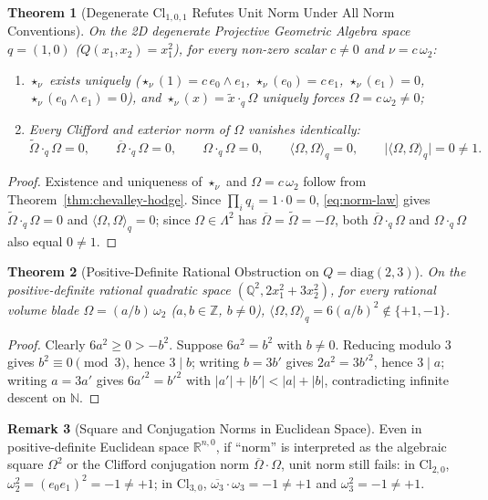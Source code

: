 \documentclass[11pt]{article}
\newtheorem{theorem}{Theorem}[section]
\theoremstyle{definition}
\newtheorem{remark}[theorem]{Remark}
\newcommand{\Cl}{\mathrm{Cl}}
\begin{document}
\begin{theorem}[Degenerate $\Cl_{1,0,1}$ Refutes Unit Norm Under All Norm Conventions]\label{thm:degenerate}
On the 2D degenerate Projective Geometric Algebra space $q = (1, 0)$ ($Q(x_1,x_2) = x_1^2$), for every non-zero scalar $c \neq 0$ and $\nu = c\,\omega_2$:
\begin{enumerate}
  \item[(1)] $\star_\nu$ exists uniquely ($\star_\nu(1) = c\,e_0\wedge e_1$, $\star_\nu(e_0) = c\,e_1$, $\star_\nu(e_1) = 0$, $\star_\nu(e_0\wedge e_1) = 0$), and $\star_\nu(x) = \widetilde{x}\cdot_q\Omega$ uniquely forces $\Omega = c\,\omega_2 \neq 0$;
  \item[(2)] Every Clifford and exterior norm of $\Omega$ vanishes identically:
  \[
    \widetilde{\Omega}\cdot_q\Omega = 0, \qquad \overline{\Omega}\cdot_q\Omega = 0, \qquad \Omega\cdot_q\Omega = 0, \qquad \langle\Omega,\Omega\rangle_q = 0, \qquad \bigl|\langle\Omega,\Omega\rangle_q\bigr| = 0 \neq 1.
  \]
\end{enumerate}
\end{theorem}
\begin{proof}
Existence and uniqueness of $\star_\nu$ and $\Omega = c\,\omega_2$ follow from Theorem~\ref{thm:chevalley-hodge}. Since $\prod_i q_i = 1\cdot 0 = 0$, \eqref{eq:norm-law} gives $\widetilde{\Omega}\cdot_q\Omega = 0$ and $\langle\Omega,\Omega\rangle_q = 0$; since $\Omega \in \Lambda^2$ has $\overline{\Omega} = \widetilde{\Omega} = -\Omega$, both $\overline{\Omega}\cdot_q\Omega$ and $\Omega\cdot_q\Omega$ also equal $0 \neq 1$.
\end{proof}

\begin{theorem}[Positive-Definite Rational Obstruction on $Q = \mathrm{diag}(2,3)$]\label{thm:rational}
On the positive-definite rational quadratic space $(\mathbb{Q}^2, 2x_1^2 + 3x_2^2)$, for every rational volume blade $\Omega = (a/b)\,\omega_2$ ($a, b \in \mathbb{Z}$, $b \neq 0$), $\langle \Omega, \Omega \rangle_q = 6(a/b)^2 \notin \{+1, -1\}$.
\end{theorem}
\begin{proof}
Clearly $6a^2 \ge 0 > -b^2$. Suppose $6a^2 = b^2$ with $b \neq 0$. Reducing modulo $3$ gives $b^2 \equiv 0 \pmod 3$, hence $3 \mid b$; writing $b = 3b'$ gives $2a^2 = 3b'^2$, hence $3 \mid a$; writing $a = 3a'$ gives $6a'^2 = b'^2$ with $|a'|+|b'| < |a|+|b|$, contradicting infinite descent on $\mathbb{N}$.
\end{proof}

\begin{remark}[Square and Conjugation Norms in Euclidean Space]\label{rem:euc-other-norms}
Even in positive-definite Euclidean space $\mathbb{R}^{n,0}$, if ``norm'' is interpreted as the algebraic square $\Omega^2$ or the Clifford conjugation norm $\overline{\Omega}\cdot\Omega$, unit norm still fails: in $\Cl_{2,0}$, $\omega_2^2 = (e_0 e_1)^2 = -1 \neq +1$; in $\Cl_{3,0}$, $\overline{\omega_3}\cdot\omega_3 = -1 \neq +1$ and $\omega_3^2 = -1 \neq +1$.
\end{remark}
\end{document}
